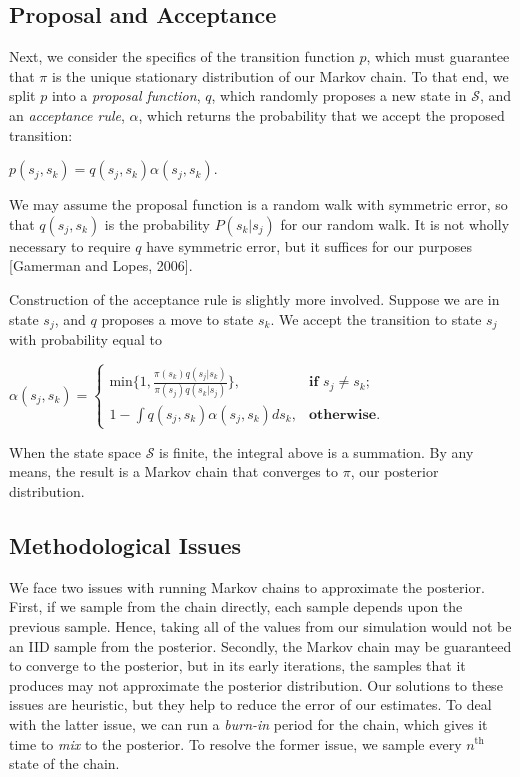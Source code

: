 \documentclass[12pt,twoside]{reedthesis}
\begin{document}
		\subsection*{Proposal and Acceptance}
			Next, we consider the specifics of the transition function $p$, which must guarantee that $\pi$ is the unique stationary distribution of our Markov chain. 
			To that end, we split $p$ into a {\em proposal function}, $q$, which randomly proposes a new state in $\mathcal S$, and an {\em acceptance rule}, $\alpha$, which returns the probability that we accept the proposed transition:
			\begin{center}
			$
			p(s_j,s_k) = q(s_j,s_k) \alpha(s_j,s_k).
			$
			\end{center}
			We may assume the proposal function is a random walk with symmetric error, so that $q(s_j,s_k)$ is the probability $P(s_k | s_j)$ for our random walk.
			It is not wholly necessary to require $q$ have symmetric error, but it suffices for our purposes [Gamerman and Lopes, 2006].
			
			Construction of the acceptance rule is slightly more involved. 
			Suppose we are in state $s_j$, and $q$ proposes a move to state $s_k$. 
			We accept the transition to state $s_j$ with probability equal to
			\begin{center}
			$ \alpha(s_j,s_k) = 
			\begin{cases} \textrm{min}\{1, \frac{\pi(s_k)q(s_j | s_k)}{\pi(s_j)q(s_k | s_j)}\}, & \textbf{if\ \ \ } s_j \neq s_k; \\
			1 - \int q(s_j,s_k)\alpha(s_j,s_k)ds_k, & \textbf{otherwise}. \end{cases}
			$
			\end{center}
			When the state space $\mathcal S$ is finite, the integral above is a summation.
			By any means, the result is a Markov chain that converges to $\pi$, our posterior distribution.
			
		\subsection*{Methodological Issues}
			We face two issues with running Markov chains to approximate the posterior. 
			First, if we sample from the chain directly, each sample depends upon the previous sample. 
			Hence, taking all of the values from our simulation would not be an IID sample from the posterior. 
			Secondly, the Markov chain may be guaranteed to converge to the posterior, but in its early iterations, the samples that it produces may not approximate the posterior distribution. 
			Our solutions to these issues are heuristic, but they help to reduce the error of our estimates. 
			To deal with the latter issue, we can run a {\em burn-in} period for the chain, which gives it time to {\em mix} to the posterior. To resolve the former issue, we sample every $n^{\text{th}}$ state of the chain.
			
\end{document}
